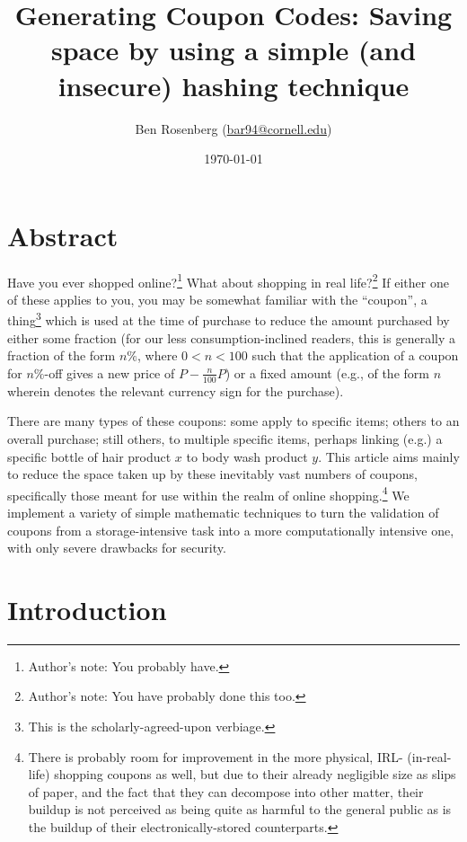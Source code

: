 \documentclass{article}
\title{Generating Coupon Codes: Saving space by using a simple (and insecure) hashing technique}
\author{Ben Rosenberg (\href{mailto:bar94@cornell.edu}{bar94@cornell.edu})}
\date{\today}
\begin{document}
\maketitle

\begin{multicols}{2}

\section{Abstract}

Have you ever shopped online?\footnote{Author's note: You probably have.} What about shopping in real life?\footnote{Author's note: You have probably done this too.} If either one of these applies to you, you may be somewhat familiar with the ``coupon'', a thing\footnote{This is the scholarly-agreed-upon verbiage.} which is used at the time of purchase to reduce the amount purchased by either some fraction (for our less consumption-inclined readers, this is generally a fraction of the form $n\%$, where $0 < n < 100$ such that the application of a coupon for $n\%$-off gives a new price of $P - \frac{n}{100}P$) or a fixed amount (e.g., of the form \textcurrency$n$ wherein \textcurrency \hspace{0.5em} denotes the relevant currency sign for the purchase).

There are many types of these coupons: some apply to specific items; others to an overall purchase; still others, to multiple specific items, perhaps linking (e.g.) a specific bottle of hair product $x$ to body wash product $y$. This article aims mainly to reduce the space taken up by these inevitably vast numbers of coupons, specifically those meant for use within the realm of online shopping.\footnote{There is probably room for improvement in the more physical, IRL- (in-real-life) shopping coupons as well, but due to their already negligible size as slips of paper, and the fact that they can decompose into other matter, their buildup is not perceived as being quite as harmful to the general public as is the buildup of their electronically-stored counterparts.} We implement a variety of simple mathematic techniques to turn the validation of coupons from a storage-intensive task into a more computationally intensive one, with only severe drawbacks for security.

\section{Introduction}


\end{multicols}
\end{document}
